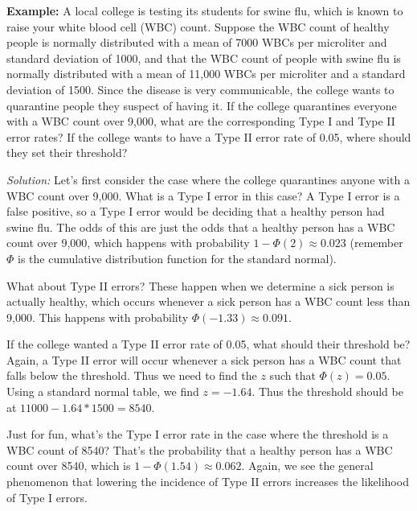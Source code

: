 \textbf{Example:}  \ex A local college is testing its students for swine flu, which is known to raise your white blood cell (WBC) count.  Suppose the WBC count of healthy people is normally distributed with a mean of 7000 WBCs per microliter and standard deviation of 1000, and that the WBC count of people with swine flu is normally distributed with a mean of 11,000 WBCs per microliter and a standard deviation of 1500. Since the disease is very communicable, the college wants to quarantine people they suspect of having it.  If the college quarantines everyone with a WBC count over 9,000, what are the corresponding Type I and Type II error rates?  If the college wants to have a Type II error rate of 0.05, where should they set their threshold?





\emph{Solution:} Let's first consider the case where the college quarantines anyone with a WBC count over 9,000.  What is a Type I error in this case?  A Type I error is a false positive, so a Type I error would be deciding that a healthy person had swine flu.  The odds of this are just the odds that a healthy person has a WBC count over 9,000, which happens with probability $1-\Phi(2)\approx 0.023$ (remember $\Phi$ is the cumulative distribution function for the standard normal).



What about Type II errors?  These happen when we determine a sick person is actually healthy, which occurs whenever a sick person has a WBC count less than 9,000.  This happens with probability $\Phi(-1.33)\approx 0.091$.



If the college wanted a Type II error rate of 0.05, what should their threshold be?  Again, a Type II error will occur whenever a sick person has a WBC count that falls below the threshold.  Thus we need to find the $z$ such that $\Phi(z)=0.05$.  Using a standard normal table, we find $z = -1.64$.  Thus the threshold should be at $11000 - 1.64*1500 = 8540$.



Just for fun, what's the Type I error rate in the case where the threshold is a WBC count of 8540?  That's the probability that a healthy person has a WBC count over 8540, which is $1-\Phi(1.54)\approx 0.062$.  Again, we see the general phenomenon that lowering the incidence of Type II errors increases the likelihood of Type I errors.





